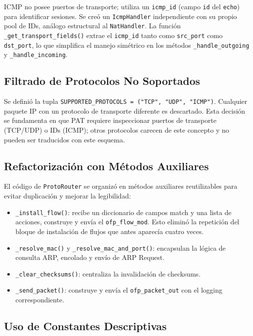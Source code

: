 \documentclass[11pt, a4paper]{article}
\begin{document}
ICMP no posee puertos de transporte; utiliza un \texttt{icmp\_id} (campo \texttt{id} del \texttt{echo}) para identificar sesiones. Se creó un \texttt{IcmpHandler} independiente con su propio pool de IDs, análogo estructural al \texttt{NatHandler}. La función \texttt{\_get\_transport\_fields()} extrae el \texttt{icmp\_id} tanto como \texttt{src\_port} como \texttt{dst\_port}, lo que simplifica el manejo simétrico en los métodos \texttt{\_handle\_outgoing} y \texttt{\_handle\_incoming}.

\subsection{Filtrado de Protocolos No Soportados}
\label{subsec:filtrado}

Se definió la tupla \verb|SUPPORTED_PROTOCOLS = ("TCP", "UDP", "ICMP")|. Cualquier paquete IP con un protocolo de transporte diferente es descartado. Esta decisión se fundamenta en que PAT requiere inspeccionar puertos de transporte (TCP/UDP) o IDs (ICMP); otros protocolos carecen de este concepto y no pueden ser traducidos con este esquema.

\subsection{Refactorización con Métodos Auxiliares}
\label{subsec:refactor}

El código de \texttt{ProtoRouter} se organizó en métodos auxiliares reutilizables para evitar duplicación y mejorar la legibilidad:

\begin{itemize}
    \item \texttt{\_install\_flow()}: recibe un diccionario de campos match y una lista de acciones, construye y envía el \texttt{ofp\_flow\_mod}. Esto eliminó la repetición del bloque de instalación de flujos que antes aparecía cuatro veces.
    \item \texttt{\_resolve\_mac()} y \texttt{\_resolve\_mac\_and\_port()}: encapsulan la lógica de consulta ARP, encolado y envío de ARP Request.
    \item \texttt{\_clear\_checksums()}: centraliza la invalidación de checksums.
    \item \texttt{\_send\_packet()}: construye y envía el \texttt{ofp\_packet\_out} con el logging correspondiente.
\end{itemize}

\subsection{Uso de Constantes Descriptivas}
\label{subsec:constantes}
\end{document}
